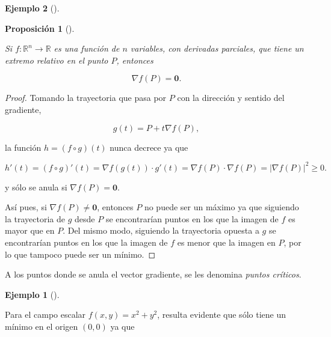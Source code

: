 \documentclass[
  a4paper,
]{scrreport}
\theoremstyle{definition}
\newtheorem{example}{Ejemplo}[chapter]
\theoremstyle{plain}
\theoremstyle{definition}
\theoremstyle{definition}
\theoremstyle{plain}
\theoremstyle{plain}
\newtheorem{proposition}{Proposición}[chapter]
\theoremstyle{remark}
\begin{document}
\begin{example}[]
\begin{proposition}[]\protect\hypertarget{prp-anulacion-gradiente-extremo}{}\label{prp-anulacion-gradiente-extremo}

Si \(f:\mathbb{R}^n\to \mathbb{R}\) es una función de \(n\) variables,
con derivadas parciales, que tiene un extremo relativo en el punto
\(P\), entonces

\[
\nabla f(P) = \mathbf{0}.
\]

\end{proposition}

\begin{tcolorbox}[enhanced jigsaw, leftrule=.75mm, colbacktitle=quarto-callout-note-color!10!white, toprule=.15mm, opacityback=0, opacitybacktitle=0.6, toptitle=1mm, breakable, bottomtitle=1mm, colframe=quarto-callout-note-color-frame, rightrule=.15mm, titlerule=0mm, title=\textcolor{quarto-callout-note-color}{\faInfo}\hspace{0.5em}{Demostración}, arc=.35mm, left=2mm, bottomrule=.15mm, colback=white, coltitle=black]

\begin{proof}
Tomando la trayectoria que pasa por \(P\) con la dirección y sentido del
gradiente,

\[
g(t)=P+t\nabla f(P),
\]

la función \(h=(f\circ g)(t)\) nunca decrece ya que

\[
h'(t)
= (f\circ g)'(t) 
= \nabla f(g(t))\cdot g'(t) 
= \nabla f(P)\cdot \nabla f(P) = 
|\nabla f(P)|^2\geq 0.
\]

y sólo se anula si \(\nabla f(P)= \mathbf{0}\).

Así pues, si \(\nabla f(P)\neq \mathbf{0}\), entonces \(P\) no puede ser
un máximo ya que siguiendo la trayectoria de \(g\) desde \(P\) se
encontrarían puntos en los que la imagen de \(f\) es mayor que en \(P\).
Del mismo modo, siguiendo la trayectoria opuesta a \(g\) se encontrarían
puntos en los que la imagen de \(f\) es menor que la imagen en \(P\),
por lo que tampoco puede ser un mínimo.
\end{proof}

\end{tcolorbox}

A los puntos donde se anula el vector gradiente, se les denomina
\emph{puntos críticos}.

\begin{example}[]\protect\hypertarget{exm-extremos-relativos}{}\label{exm-extremos-relativos}

Para el campo escalar \(f(x,y)=x^2+y^2\), resulta evidente que sólo
tiene un mínimo en el origen \((0,0)\) ya que


\end{example}
\end{example}
\end{document}
